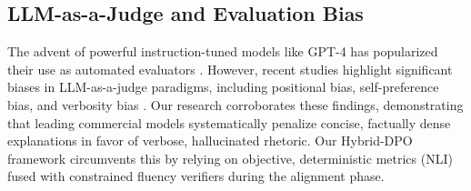 \subsection{LLM-as-a-Judge and Evaluation Bias}
The advent of powerful instruction-tuned models like GPT-4 has popularized their use as automated evaluators \cite{zheng2024judging}. However, recent studies highlight significant biases in LLM-as-a-judge paradigms, including positional bias, self-preference bias, and verbosity bias \cite{wang2023large}. Our research corroborates these findings, demonstrating that leading commercial models systematically penalize concise, factually dense explanations in favor of verbose, hallucinated rhetoric. Our Hybrid-DPO framework circumvents this by relying on objective, deterministic metrics (NLI) fused with constrained fluency verifiers during the alignment phase.
